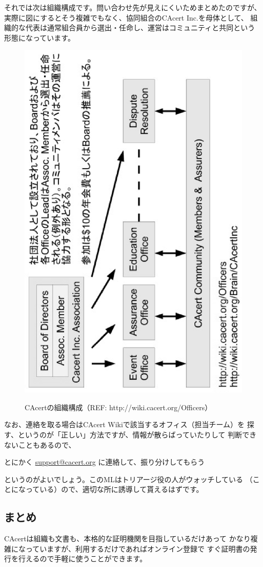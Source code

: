 \documentclass[mingoth,a4paper]{jsarticle}
\begin{document}
それでは次は組織構成です。問い合わせ先が見えにくいためまとめたのですが、
実際に図にするとそう複雑でもなく、協同組合のCAcert Inc.を母体として、
組織的な代表は通常組合員から選出・任命し、運営はコミュニティと共同という
形態になっています。

\begin{figure}[H]
\begin{center}
\vspace{15mm}
\includegraphics[width=0.6\hsize,angle=270]{image201012/cacertorg.eps}
\label{cacertdocs}
\end{center}
\caption{CAcertの組織構成（REF: http://wiki.cacert.org/Officers）}
\end{figure}

なお、連絡を取る場合はCAcert Wikiで該当するオフィス（担当チーム）を
探す、というのが「正しい」方法ですが、情報が散らばっていたりして
判断できないこともあるので、
\begin{center}
\Large{とにかく \url{support@cacert.org} に連絡して、振り分けしてもらう}
\end{center}
というのがよいでしょう。このMLはトリアージ役の人がウォッチしている
（ことになっている）ので、適切な所に誘導して貰えるはずです。

\subsection{まとめ}
CAcertは組織も文書も、本格的な証明機関を目指しているだけあって
かなり複雑になっていますが、利用するだけであればオンライン登録で
すぐ証明書の発行を行えるので手軽に使うことができます。
\end{document}
